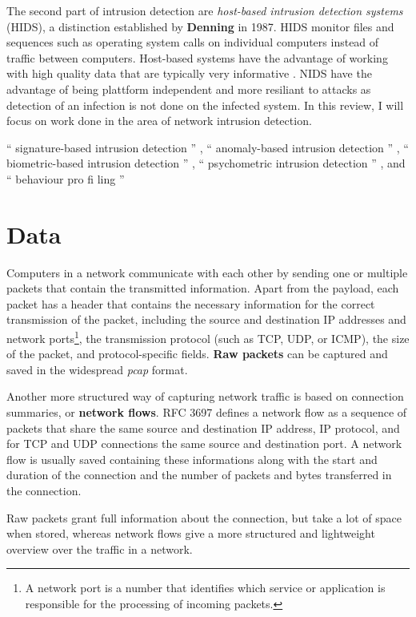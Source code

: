 \documentclass[a4paper,12pt,twoside]{report}
\begin{document}
The second part of intrusion detection are \textit{host-based intrusion detection systems} (HIDS), a distinction established by \textbf{Denning} \cite{denning1987intrusion} in 1987. HIDS monitor files and sequences such as operating system calls on individual computers instead of traffic between computers. Host-based systems have the advantage of working with high quality data that   are   typically   very   informative \cite{lazarevic2005intrusion}. NIDS have the advantage of being plattform independent and more resiliant to attacks as detection of an infection is not done on the infected system. In this review, I will focus on work done in the area of network intrusion detection.





“
signature-based intrusion detection
”
,
“
anomaly-based intrusion
detection
”
,
“
biometric-based intrusion detection
”
,
“
psychometric
intrusion detection
”
, and
“
behaviour pro
fi
ling
”



\chapter{Data}

Computers in a network communicate with each other by sending one or multiple packets that contain the transmitted information. Apart from the payload, each packet has a header that contains the necessary information for the correct transmission of the packet, including the source and destination IP addresses and network ports\footnote{A network port is a number that identifies which service or application is responsible for the processing of incoming packets.}, the transmission protocol (such as TCP, UDP, or ICMP), the size of the packet, and protocol-specific fields. \textbf{Raw packets} can be captured and saved in the widespread \textit{pcap} format. 


Another more structured way of capturing network traffic is based on connection summaries, or \textbf{network flows}. RFC 3697 \cite{brownlee1999traffic} defines a network flow as a sequence of packets that share the same source and destination IP address, IP protocol, and for TCP and UDP connections the same source and destination port. A network flow is usually saved containing these informations along with the start and duration of the connection and the number of packets and bytes transferred in the connection.


Raw packets grant full information about the connection, but take a lot of space when stored, whereas network flows give a more structured and lightweight overview over the traffic in a network. 
\end{document}
